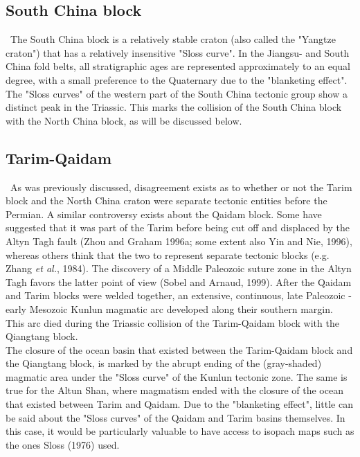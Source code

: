 \documentclass{article}
\begin{document}
 \subsection*{South China block} \label{sec:south}
 ~\indent The  South China  block is a  relatively stable  craton (also
 called the "Yangtze craton") that has a relatively insensitive "Sloss
 curve". In the Jiangsu- and South China fold belts, all stratigraphic
 ages are represented  approximately to an equal degree,  with a small
 preference  to the Quaternary  due to  the "blanketing  effect".  The
 "Sloss curves" of the western  part of the South China tectonic group
 show a  distinct peak in the  Triassic.  This marks  the collision of
 the  South  China  block with  the  North  China  block, as  will  be
 discussed below.

 \subsection*{Tarim-Qaidam} \label{sec:tarimqaidam}
 ~\indent  As  was  previously  discussed, disagreement  exists  as  to
 whether  or not  the  Tarim block  and  the North  China craton  were
 separate tectonic entities before the Permian.  A similar controversy
 exists about the Qaidam block.   Some have suggested that it was part
 of the  Tarim before being  cut off and  displaced by the  Altyn Tagh
 fault (Zhou  and Graham 1996a; some  extent also Yin  and Nie, 1996),
 whereas  others think  that the  two to  represent  separate tectonic
 blocks (e.g.  Zhang {\it  et al.}, 1984).   The discovery of  a Middle
 Paleozoic suture  zone in the Altyn  Tagh favors the  latter point of
 view (Sobel and Arnaud, 1999). After the Qaidam and Tarim blocks were
 welded  together, an  extensive, continuous,  late Paleozoic  - early
 Mesozoic   Kunlun  magmatic  arc   developed  along   their  southern
 margin.  This   arc  died  during  the  Triassic   collision  of  the
 Tarim-Qaidam block with the Qiangtang block.\\

 The closure of the ocean  basin that existed between the Tarim-Qaidam
 block and the Qiangtang block, is  marked by the abrupt ending of the
 (gray-shaded)  magmatic area under  the "Sloss  curve" of  the Kunlun
 tectonic zone. The  same is true for the  Altun Shan, where magmatism
 ended with  the closure of the  ocean that existed  between Tarim and
 Qaidam. Due to the "blanketing  effect", little can be said about the
 "Sloss curves"  of the  Qaidam and Tarim  basins themselves.  In this
 case, it  would be  particularly valuable to  have access  to isopach
 maps such as the ones Sloss (1976) used.
\end{document}
